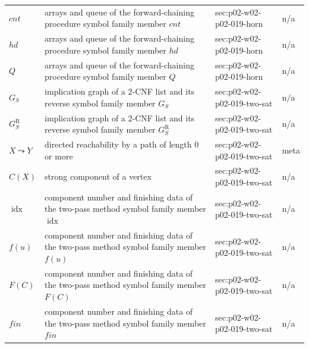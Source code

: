 \begin{longtable}{@{}p{}p{}p{}p{}@{}}
\(\mathit{cnt}\) & arrays and queue of the forward-chaining procedure symbol family member \(\mathit{cnt}\) & sec:\allowbreak{}p02-\allowbreak{}w02-\allowbreak{}p02-\allowbreak{}019-\allowbreak{}horn & n/a \\
\(\mathit{hd}\) & arrays and queue of the forward-chaining procedure symbol family member \(\mathit{hd}\) & sec:\allowbreak{}p02-\allowbreak{}w02-\allowbreak{}p02-\allowbreak{}019-\allowbreak{}horn & n/a \\
\(Q\) & arrays and queue of the forward-chaining procedure symbol family member \(Q\) & sec:\allowbreak{}p02-\allowbreak{}w02-\allowbreak{}p02-\allowbreak{}019-\allowbreak{}horn & n/a \\
\(G_S\) & implication graph of a 2-CNF list and its reverse symbol family member \(G_S\) & sec:\allowbreak{}p02-\allowbreak{}w02-\allowbreak{}p02-\allowbreak{}019-\allowbreak{}two-\allowbreak{}sat & n/a \\
\(G_S^{\mathrm R}\) & implication graph of a 2-CNF list and its reverse symbol family member \(G_S^{\mathrm R}\) & sec:\allowbreak{}p02-\allowbreak{}w02-\allowbreak{}p02-\allowbreak{}019-\allowbreak{}two-\allowbreak{}sat & n/a \\
\(X\leadsto Y\) & directed reachability by a path of length 0 or more & sec:\allowbreak{}p02-\allowbreak{}w02-\allowbreak{}p02-\allowbreak{}019-\allowbreak{}two-\allowbreak{}sat & meta \\
\(C(X)\) & strong component of a vertex & sec:\allowbreak{}p02-\allowbreak{}w02-\allowbreak{}p02-\allowbreak{}019-\allowbreak{}two-\allowbreak{}sat & n/a \\
\(\operatorname{idx}\) & component number and finishing data of the two-pass method symbol family member \(\operatorname{idx}\) & sec:\allowbreak{}p02-\allowbreak{}w02-\allowbreak{}p02-\allowbreak{}019-\allowbreak{}two-\allowbreak{}sat & n/a \\
\(f(u)\) & component number and finishing data of the two-pass method symbol family member \(f(u)\) & sec:\allowbreak{}p02-\allowbreak{}w02-\allowbreak{}p02-\allowbreak{}019-\allowbreak{}two-\allowbreak{}sat & n/a \\
\(F(C)\) & component number and finishing data of the two-pass method symbol family member \(F(C)\) & sec:\allowbreak{}p02-\allowbreak{}w02-\allowbreak{}p02-\allowbreak{}019-\allowbreak{}two-\allowbreak{}sat & n/a \\
\(\mathit{fin}\) & component number and finishing data of the two-pass method symbol family member \(\mathit{fin}\) & sec:\allowbreak{}p02-\allowbreak{}w02-\allowbreak{}p02-\allowbreak{}019-\allowbreak{}two-\allowbreak{}sat & n/a \\

\end{longtable}
